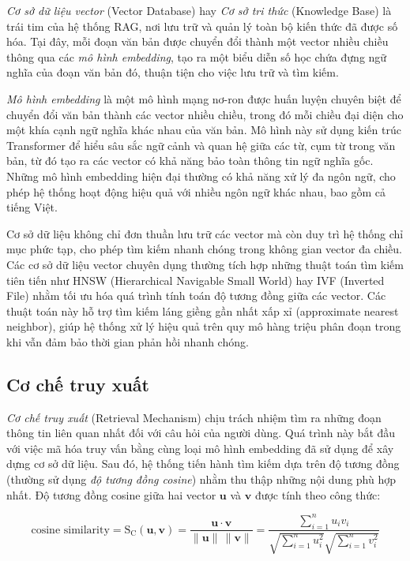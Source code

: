 \emph{Cơ sở dữ liệu vector} (Vector Database) hay \emph{Cơ sở tri thức} (Knowledge Base) là trái tim của hệ thống RAG, nơi lưu trữ và quản lý toàn bộ kiến thức đã được số hóa. Tại đây, mỗi đoạn văn bản được chuyển đổi thành một vector nhiều chiều thông qua các \emph{mô hình embedding}, tạo ra một biểu diễn số học chứa đựng ngữ nghĩa của đoạn văn bản đó, thuận tiện cho việc lưu trữ và tìm kiếm.

\emph{Mô hình embedding} là một mô hình mạng nơ-ron được huấn luyện chuyên biệt để chuyển đổi văn bản thành các vector nhiều chiều, trong đó mỗi chiều đại diện cho một khía cạnh ngữ nghĩa khác nhau của văn bản. Mô hình này sử dụng kiến trúc Transformer để hiểu sâu sắc ngữ cảnh và quan hệ giữa các từ, cụm từ trong văn bản, từ đó tạo ra các vector có khả năng bảo toàn thông tin ngữ nghĩa gốc. Những mô hình embedding hiện đại thường có khả năng xử lý đa ngôn ngữ, cho phép hệ thống hoạt động hiệu quả với nhiều ngôn ngữ khác nhau, bao gồm cả tiếng Việt.

Cơ sở dữ liệu không chỉ đơn thuần lưu trữ các vector mà còn duy trì hệ thống chỉ mục phức tạp, cho phép tìm kiếm nhanh chóng trong không gian vector đa chiều. Các cơ sở dữ liệu vector chuyên dụng thường tích hợp những thuật toán tìm kiếm tiên tiến như HNSW (Hierarchical Navigable Small World) hay IVF (Inverted File) nhằm tối ưu hóa quá trình tính toán độ tương đồng giữa các vector. Các thuật toán này hỗ trợ tìm kiếm láng giềng gần nhất xấp xỉ (approximate nearest neighbor), giúp hệ thống xử lý hiệu quả trên quy mô hàng triệu phân đoạn trong khi vẫn đảm bảo thời gian phản hồi nhanh chóng.

\subsection{Cơ chế truy xuất}

\emph{Cơ chế truy xuất} (Retrieval Mechanism) chịu trách nhiệm tìm ra những đoạn thông tin liên quan nhất đối với câu hỏi của người dùng. Quá trình này bắt đầu với việc mã hóa truy vấn bằng cùng loại mô hình embedding đã sử dụng để xây dựng cơ sở dữ liệu. Sau đó, hệ thống tiến hành tìm kiếm dựa trên độ tương đồng (thường sử dụng \emph{độ tương đồng cosine}) nhằm thu thập những nội dung phù hợp nhất. Độ tương đồng cosine giữa hai vector \(\mathbf{u}\) và \(\mathbf{v}\) được tính theo công thức:

\[
\text{cosine similarity}
= \mathrm{S_C}(\mathbf{u},\mathbf{v})
= \frac{\mathbf{u}\cdot\mathbf{v}}{\lVert \mathbf{u} \rVert \, \lVert \mathbf{v} \rVert}
= \frac{\sum_{i=1}^{n} u_i v_i}{\sqrt{\sum_{i=1}^{n} u_i^2}\sqrt{\sum_{i=1}^{n} v_i^2}} 
\]

